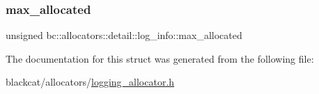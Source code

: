 \subsubsection{\texorpdfstring{max\+\_\+allocated}{max\_allocated}}
{\footnotesize\ttfamily unsigned bc\+::allocators\+::detail\+::log\+\_\+info\+::max\+\_\+allocated}



The documentation for this struct was generated from the following file\+:\begin{DoxyCompactItemize}
\item 
blackcat/allocators/\hyperlink{logging__allocator_8h}{logging\+\_\+allocator.\+h}\end{DoxyCompactItemize}
